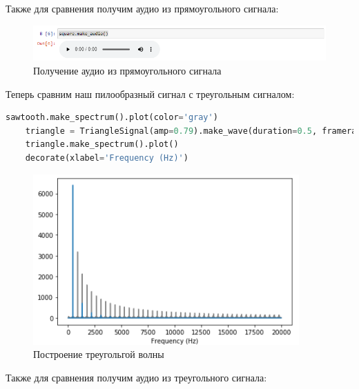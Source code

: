 \documentclass[a4paper]{article}
\begin{document}
            Также для сравнения получим аудио из прямоугольного сигнала:
            
            \begin{figure}[H]
                \centering
                \includegraphics[width=\textwidth]{ex_2_compare_square_audio.png}
                \caption{Получение аудио из прямоугольного сигнала}
                \label{fig:compare_square_audio}
            \end{figure}
            
            Теперь сравним наш пилообразный сигнал с треугольным сигналом:
            
\begin{lstlisting}[language=Python, caption= Построение треугольной волны]
    sawtooth.make_spectrum().plot(color='gray')
    triangle = TriangleSignal(amp=0.79).make_wave(duration=0.5, framerate=40000)
    triangle.make_spectrum().plot()
    decorate(xlabel='Frequency (Hz)')
\end{lstlisting}               
            
            \begin{figure}[H]
                \centering
                \includegraphics[width=\textwidth]{ex_2_compare_triangle.png}
                \caption{Построение треугольгой волны}
                \label{fig:compare_triangle}
            \end{figure}
            
            Также для сравнения получим аудио из треугольного сигнала:
            
\end{document}
